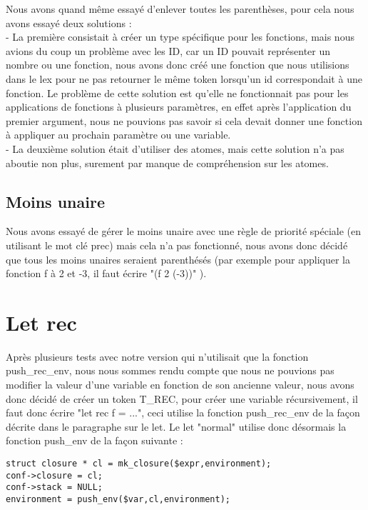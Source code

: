 \documentclass{report}
\begin{document}
Nous avons quand même essayé d'enlever toutes les parenthèses, pour cela nous avons essayé deux solutions :\\
- La première consistait à créer un type spécifique pour les fonctions, mais nous avions du coup un problème avec les ID, car un ID pouvait représenter un nombre ou une fonction, nous avons donc créé une fonction que nous utilisions dans le lex pour ne pas retourner le même token lorsqu'un id correspondait à une fonction. Le problème de cette solution est qu'elle ne fonctionnait pas pour les applications de fonctions à plusieurs paramètres, en effet après l'application du premier argument, nous ne pouvions pas savoir si cela devait donner une fonction à appliquer au prochain paramètre ou une variable.\\
- La deuxième solution était d'utiliser des atomes, mais cette solution n'a pas aboutie non plus, surement par manque de compréhension sur les atomes.

\subsection{Moins unaire}
Nous avons essayé de gérer le moins unaire avec une règle de priorité spéciale (en utilisant le mot clé prec) mais cela n'a pas fonctionné, nous avons donc décidé que tous les moins unaires seraient parenthésés (par exemple pour appliquer la fonction f à 2 et -3, il faut écrire "(f 2 (-3))" ).

\section{Let rec}
Après plusieurs tests avec notre version qui n'utilisait que la fonction push\_rec\_env, nous nous sommes rendu compte que nous ne pouvions pas modifier la valeur d'une variable en fonction de son ancienne valeur, nous avons donc décidé de créer un token T\_REC, pour créer une variable récursivement, il faut donc écrire "let rec f = ...", ceci utilise la fonction push\_rec\_env de la façon décrite dans le paragraphe sur le let. Le let "normal" utilise donc désormais la fonction push\_env de la façon suivante :
\begin{verbatim}
struct closure * cl = mk_closure($expr,environment);
conf->closure = cl;
conf->stack = NULL;
environment = push_env($var,cl,environment);
\end{verbatim}
\end{document}
